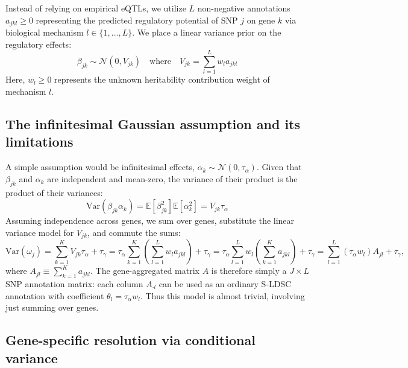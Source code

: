 \documentclass[11pt]{article}
\begin{document}
Instead of relying on empirical eQTLs, we utilize $L$ non-negative annotations $a_{jkl} \ge 0$ representing the predicted regulatory potential of SNP $j$ on gene $k$ via biological mechanism $l \in \{1, \dots, L\}$. We place a linear variance prior on the regulatory effects:
\begin{equation}
    \beta_{jk} \sim \mathcal{N}(0, V_{jk}) \quad \text{where} \quad V_{jk} = \sum_{l=1}^L w_l a_{jkl}
\end{equation}
Here, $w_l \ge 0$ represents the unknown heritability contribution weight of mechanism $l$.

\subsection{The infinitesimal Gaussian assumption and its limitations}

A simple assumption would be infinitesimal effects, $\alpha_k \sim \mathcal{N}(0, \tau_\alpha)$. Given that $\beta_{jk}$ and $\alpha_k$ are independent and mean-zero, the variance of their product is the product of their variances:
\begin{equation}
    \text{Var}(\beta_{jk} \alpha_k) = \mathbb{E}[\beta_{jk}^2] \mathbb{E}[\alpha_k^2] = V_{jk} \tau_\alpha
\end{equation}
Assuming independence across genes, we sum over genes, substitute the linear variance model for $V_{jk}$, and commute the sums:
\begin{equation}
    \text{Var}(\omega_j) = \sum_{k=1}^K V_{jk} \tau_\alpha + \tau_\gamma = \tau_\alpha \sum_{k=1}^K \left( \sum_{l=1}^L w_l a_{jkl} \right) + \tau_\gamma = \tau_\alpha \sum_{l=1}^L w_l \left( \sum_{k=1}^K a_{jkl} \right) + \tau_\gamma = \sum_{l=1}^L (\tau_\alpha w_l) A_{jl} + \tau_\gamma,
\end{equation}
where $A_{jl} \equiv \sum_{k=1}^K a_{jkl}$. The gene-aggregated matrix $A$ is therefore simply a $J \times L$ SNP annotation matrix: each column $A_{\cdot l}$ can be used as an ordinary S-LDSC annotation with coefficient $\theta_l = \tau_\alpha w_l$. Thus this model is almost trivial, involving just summing over genes.

\subsection{Gene-specific resolution via conditional variance}
\end{document}
